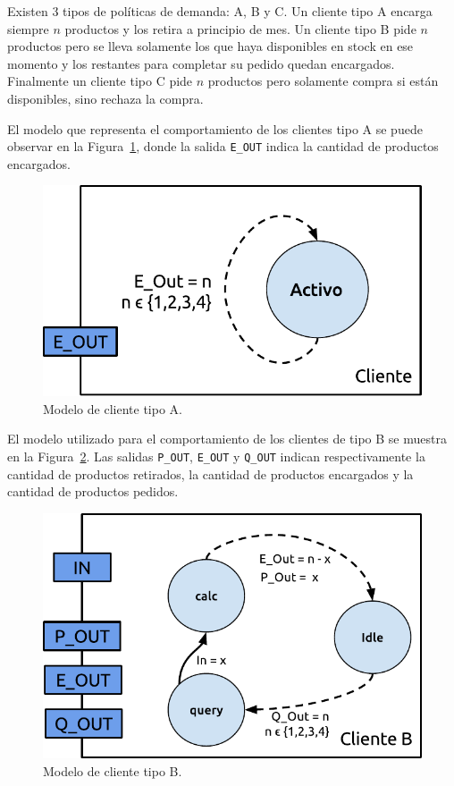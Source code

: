 \documentclass[10pt]{article}
\begin{document}
Existen 3 tipos de políticas de demanda: A, B y C. Un cliente tipo A encarga siempre $n$ productos y los retira a principio de mes. Un cliente tipo B pide $n$ productos pero se lleva solamente los que haya disponibles en stock en ese momento y los restantes para completar su pedido quedan encargados. Finalmente un cliente tipo C pide $n$ productos pero solamente compra si están disponibles, sino rechaza la compra.

El modelo que representa el comportamiento de los clientes tipo A se puede observar en la Figura~\ref{fig:fig2}, donde la salida \texttt{E\_OUT} indica la cantidad de productos encargados.

\begin{figure}
\centering
\includegraphics[scale=1]{img/figura2}
\caption{Modelo de cliente tipo A.}
\label{fig:fig2}
\end{figure}

El modelo utilizado para el comportamiento de los clientes de tipo B se muestra en la Figura~\ref{fig:fig3}. Las salidas \texttt{P\_OUT}, \texttt{E\_OUT} y \texttt{Q\_OUT} indican respectivamente la cantidad de productos retirados, la cantidad de productos encargados y la cantidad de productos pedidos.

\begin{figure}
\centering
\includegraphics[scale=1]{img/figura3}
\caption{Modelo de cliente tipo B.}
\label{fig:fig3}
\end{figure}
\end{document}
